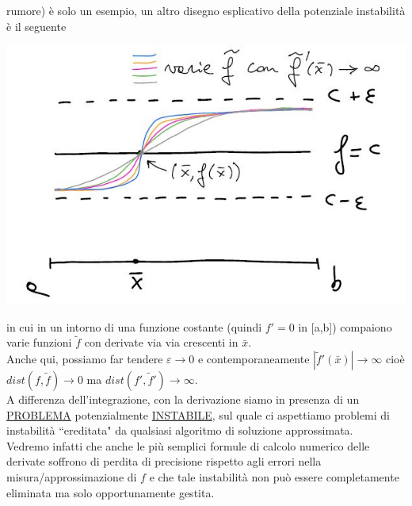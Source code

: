 \documentclass[12pt,a4paper]{article}
\begin{document}
rumore) è solo un esempio, un altro disegno esplicativo della potenziale instabilità è il seguente 
\begin{center}
    \includegraphics[scale=0.5]{calcolo2.JPG}
\end{center}
in cui in un intorno di una funzione costante (quindi $f'=0$ in [a,b]) compaiono varie funzioni $\tilde{f}$ con derivate via via crescenti in $\bar{x}$.\\
Anche qui, possiamo far tendere $\varepsilon\rightarrow0$ e contemporaneamente $|\tilde{f}'(\bar{x})|\rightarrow\infty$ cioè $dist(f,\tilde{f})\rightarrow0$ ma $dist(f',\tilde{f}')\rightarrow\infty$.\\A differenza dell'integrazione, con la derivazione siamo in presenza di un \uline{PROBLEMA} potenzialmente \uline{INSTABILE}, sul quale ci aspettiamo problemi di instabilità ``ereditata" da qualsiasi algoritmo di soluzione approssimata.\\Vedremo infatti che anche
le più semplici formule di calcolo numerico delle derivate soffrono di perdita di precisione rispetto agli errori nella misura/approssimazione di $f$ e che tale instabilità non può essere completamente eliminata ma solo opportunamente gestita.
\end{document}
